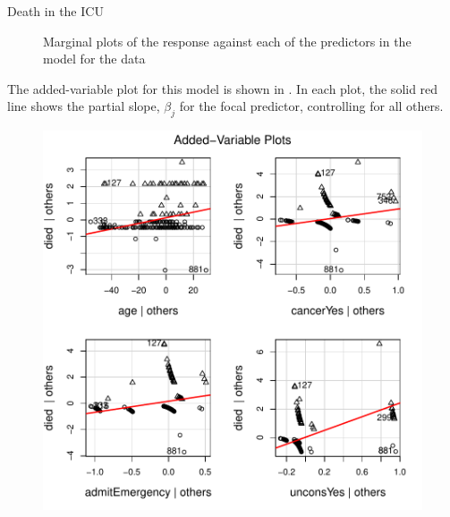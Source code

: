\documentclass[11pt]{book}
\renewenvironment{knitrout}{\small\renewcommand{\baselinestretch}{.85}}{} %
\begin{document}
\begin{Example}[icu3]{Death in the ICU}
\begin{knitrout}
\begin{figure}[!htbp]
\caption[Marginal plots of the response died against each of the predictors in the model icu.glm2 for the ICU data]{Marginal plots of the response  against each of the predictors in the model  for the  data\label{fig:icu3-marginal}}
\end{figure}


\end{knitrout}



The added-variable plot for this model is shown in . 
In each plot, the solid red line shows the partial slope, $\beta_j$ for the
focal predictor, controlling for all others.
\begin{knitrout}
\color{fgcolor}\begin{kframe}
\begin{alltt}
 \hlkwb{<-} \hlopt{$}\hlopt{==}\hlstd{,} \hlstd{,} \hlstd{)}
 \hlstd{=}\hlstd{,}  \hlstd{=}\hlstd{)}
\end{alltt}
\end{kframe}\begin{figure}[!htb]


\centerline{\includegraphics[width=.8\textwidth]{ch07/fig/icu3-avp1} }


\end{figure}
\end{knitrout}
\end{Example}
\end{document}
